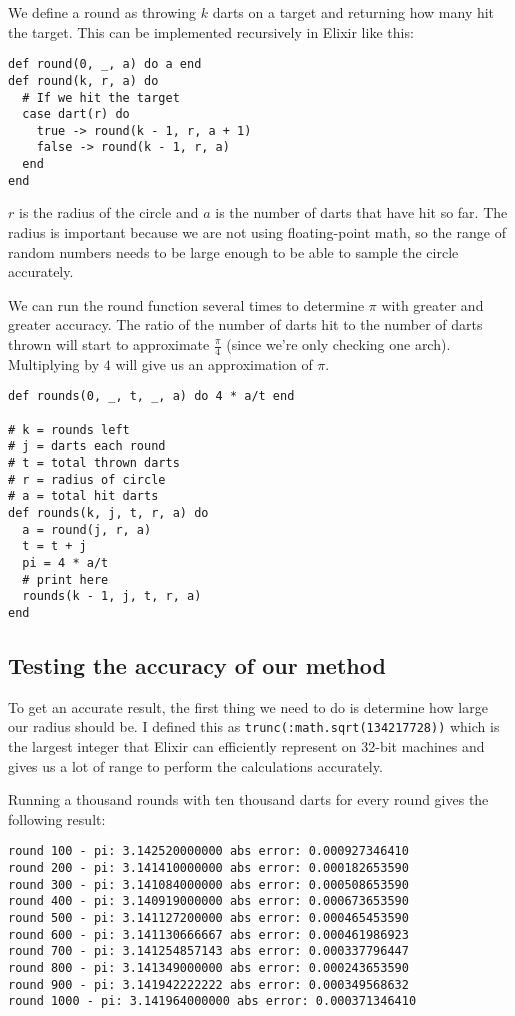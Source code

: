 \documentclass[a4paper,11pt]{article}
\begin{document}
We define a round as throwing $k$ darts on a target and returning how many hit the target. This can be implemented recursively in Elixir like this:

\begin{verbatim}
def round(0, _, a) do a end
def round(k, r, a) do
  # If we hit the target
  case dart(r) do
    true -> round(k - 1, r, a + 1)
    false -> round(k - 1, r, a)
  end
end
\end{verbatim}

$r$ is the radius of the circle and $a$ is the number of darts that have hit so far.
The radius is important because we are not using floating-point math, so the range of random numbers needs to be large enough to be able to sample the circle accurately.

We can run the round function several times to determine $\pi$ with greater and greater accuracy.
The ratio of the number of darts hit to the number of darts thrown will start to approximate $\frac{\pi}{4}$
(since we're only checking one arch). Multiplying by $4$ will give us an approximation of $\pi$.

\begin{verbatim}
def rounds(0, _, t, _, a) do 4 * a/t end

# k = rounds left
# j = darts each round
# t = total thrown darts
# r = radius of circle
# a = total hit darts
def rounds(k, j, t, r, a) do
  a = round(j, r, a)
  t = t + j
  pi = 4 * a/t
  # print here
  rounds(k - 1, j, t, r, a)
end
\end{verbatim}

\subsection*{Testing the accuracy of our method}

To get an accurate result, the first thing we need to do is determine how large our radius should be.
I defined this as \texttt{trunc(:math.sqrt(134217728))} which is the largest integer that Elixir can efficiently represent on 32-bit machines and gives us a lot of range to perform the calculations accurately.

Running a thousand rounds with ten thousand darts for every round gives the following result:

\begin{verbatim}
round 100 - pi: 3.142520000000 abs error: 0.000927346410
round 200 - pi: 3.141410000000 abs error: 0.000182653590
round 300 - pi: 3.141084000000 abs error: 0.000508653590
round 400 - pi: 3.140919000000 abs error: 0.000673653590
round 500 - pi: 3.141127200000 abs error: 0.000465453590
round 600 - pi: 3.141130666667 abs error: 0.000461986923
round 700 - pi: 3.141254857143 abs error: 0.000337796447
round 800 - pi: 3.141349000000 abs error: 0.000243653590
round 900 - pi: 3.141942222222 abs error: 0.000349568632
round 1000 - pi: 3.141964000000 abs error: 0.000371346410
\end{verbatim}
\end{document}
